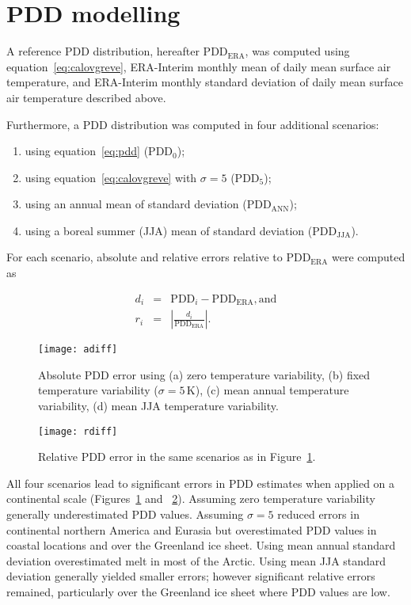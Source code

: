\documentclass[twocolumn]{igs}
\begin{document}

\section{PDD modelling}

A reference PDD distribution, hereafter $\mathrm{PDD_{ERA}}$, was computed using equation~\ref{eq:calovgreve}, ERA-Interim monthly mean of daily mean surface air temperature, and ERA-Interim monthly standard deviation of daily mean surface air temperature described above.

Furthermore, a PDD distribution was computed in four additional scenarios:

\begin{enumerate}
  \item using equation~\ref{eq:pdd} ($\mathrm{PDD_{0}}$);
  \item using equation~\ref{eq:calovgreve} with $\sigma=5$ ($\mathrm{PDD_{5}}$);
  \item using an annual mean of standard deviation ($\mathrm{PDD_{ANN}}$);
  \item using a boreal summer (JJA) mean of standard deviation ($\mathrm{PDD_{JJA}}$).
\end{enumerate}

For each scenario, absolute and relative errors relative to $\mathrm{PDD_{ERA}}$ were computed as

\begin{eqnarray}
  d_i &=& \mathrm{PDD}_i - \mathrm{PDD_{ERA}}, \mathrm{and}\\
  r_i &=& \left|\frac{d_i}{\mathrm{PDD_{ERA}}}\right|.
\end{eqnarray}

\begin{figure}
  \centering\texttt{[image: adiff]}
  \caption{Absolute PDD error using (a) zero temperature variability, (b) fixed temperature variability ($\sigma=5\,\mathrm{K}$), (c) mean annual temperature variability, (d) mean JJA temperature variability.}
  \label{fig:adiff}
\end{figure}

\begin{figure}
  \centering\texttt{[image: rdiff]}
  \caption{Relative PDD error in the same scenarios as in Figure~\ref{fig:adiff}.}
  \label{fig:rdiff}
\end{figure}

All four scenarios lead to significant errors in PDD estimates when applied on a continental scale (Figures~\ref{fig:adiff} and ~\ref{fig:rdiff}). Assuming zero temperature variability generally underestimated PDD values. Assuming $\sigma=5$ reduced errors in continental northern America and Eurasia but overestimated PDD values in coastal locations and over the Greenland ice sheet. Using mean annual standard deviation overestimated melt in most of the Arctic. Using mean JJA standard deviation generally yielded smaller errors; however significant relative errors remained, particularly over the Greenland ice sheet where PDD values are low.
\end{document}
